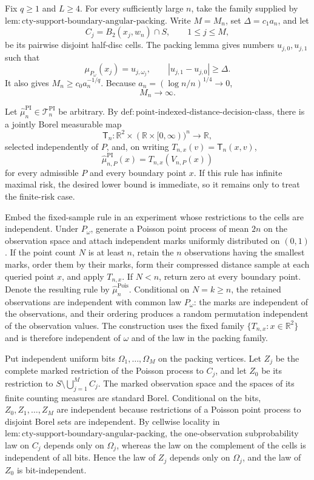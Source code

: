 Fix \(q\geq1\) and \(L\geq4\).  For every sufficiently large \(n\), take the family supplied by \(\mathrm{lem:cty\text{-}support\text{-}boundary\text{-}angular\text{-}packing}\).  Write \(M=M_n\), set \(\Delta=c_1a_n\), and let
\[
 C_j=B_2(x_j,w_n)\cap S,
 \qquad 1\leq j\leq M,
\]
be its pairwise disjoint half-disc cells.  The packing lemma gives numbers \(u_{j,0},u_{j,1}\) such that
\[
 \mu_{P_\omega}(x_j)=u_{j,\omega_j},
 \qquad |u_{j,1}-u_{j,0}|\geq\Delta.
\]
It also gives \(M_n\geq c_0a_n^{-1/q}\).  Because \(a_n=(\log n/n)^{1/4}\to0\),
\[
 M_n\longrightarrow\infty.
\]

Let \(\widehat\mu_n^{\mathrm{PI}}\in\mathcal T_n^{\mathrm{PI}}\) be arbitrary.  By \(\mathrm{def:point\text{-}indexed\text{-}distance\text{-}decision\text{-}class}\), there is a jointly Borel measurable map
\[
 \mathsf T_n:\mathbb R^2\times(\mathbb R\times[0,\infty))^n\longrightarrow\mathbb R,
\]
selected independently of \(P\), and, on writing \(T_{n,x}(v)=\mathsf T_n(x,v)\),
\[
 \widehat\mu_{n,P}^{\mathrm{PI}}(x)=T_{n,x}(V_{n,P}(x))
\]
for every admissible \(P\) and every boundary point \(x\).  If this rule has infinite maximal risk, the desired lower bound is immediate, so it remains only to treat the finite-risk case.

Embed the fixed-sample rule in an experiment whose restrictions to the cells are independent.  Under \(P_\omega\), generate a Poisson point process of mean \(2n\) on the observation space and attach independent marks uniformly distributed on \((0,1)\).  If the point count \(N\) is at least \(n\), retain the \(n\) observations having the smallest marks, order them by their marks, form their compressed distance sample at each queried point \(x\), and apply \(T_{n,x}\).  If \(N<n\), return zero at every boundary point.  Denote the resulting rule by \(\widehat\mu_n^{\mathrm{Pois}}\).  Conditional on \(N=k\geq n\), the retained observations are independent with common law \(P_\omega\): the marks are independent of the observations, and their ordering produces a random permutation independent of the observation values.  The construction uses the fixed family \(\{T_{n,x}:x\in\mathbb R^2\}\) and is therefore independent of \(\omega\) and of the law in the packing family.

Put independent uniform bits \(\Omega_1,\ldots,\Omega_M\) on the packing vertices.  Let \(Z_j\) be the complete marked restriction of the Poisson process to \(C_j\), and let \(Z_0\) be its restriction to \(S\setminus\bigcup_{j=1}^M C_j\).  The marked observation space and the spaces of its finite counting measures are standard Borel.  Conditional on the bits, \(Z_0,Z_1,\ldots,Z_M\) are independent because restrictions of a Poisson point process to disjoint Borel sets are independent.  By cellwise locality in \(\mathrm{lem:cty\text{-}support\text{-}boundary\text{-}angular\text{-}packing}\), the one-observation subprobability law on \(C_j\) depends only on \(\Omega_j\), whereas the law on the complement of the cells is independent of all bits.  Hence the law of \(Z_j\) depends only on \(\Omega_j\), and the law of \(Z_0\) is bit-independent.

